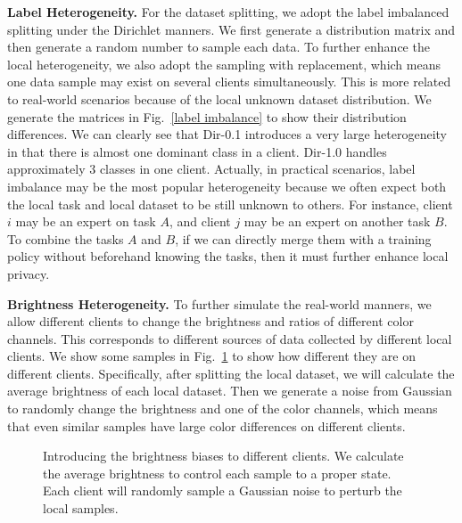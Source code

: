 \textbf{Label Heterogeneity.} For the dataset splitting, we adopt the label imbalanced splitting under the Dirichlet manners. We first generate a distribution matrix and then generate a random number to sample each data. To further enhance the local heterogeneity, we also adopt the sampling with replacement, which means one data sample may exist on several clients simultaneously. This is more related to real-world scenarios because of the local unknown dataset distribution. We generate the matrices in Fig.~\ref{label imbalance} to show their distribution differences. We can clearly see that Dir-0.1 introduces a very large heterogeneity in that there is almost one dominant class in a client. Dir-1.0 handles approximately 3 classes in one client. Actually, in practical scenarios, label imbalance may be the most popular heterogeneity because we often expect both the local task and local dataset to be still unknown to others. For instance, client $i$ may be an expert on task $A$, and client $j$ may be an expert on another task $B$. To combine the tasks $A$ and $B$, if we can directly merge them with a training policy without beforehand knowing the tasks, then it must further enhance local privacy.

\textbf{Brightness Heterogeneity.} To further simulate the real-world manners, we allow different clients to change the brightness and ratios of different color channels. This corresponds to different sources of data collected by different local clients. We show some samples in Fig.~\ref{brightness imbalance} to show how different they are on different clients. Specifically, after splitting the local dataset, we will calculate the average brightness of each local dataset. Then we generate a noise from Gaussian to randomly change the brightness and one of the color channels, which means that even similar samples have large color differences on different clients.
\begin{figure}[h]
\vskip -0.1in
\centering
\vskip -0.1in
\caption{Introducing the brightness biases to different clients. We calculate the average brightness to control each sample to a proper state. Each client will randomly sample a Gaussian noise to perturb the local samples.}
\label{brightness imbalance}
\vskip -0.1in
\end{figure}

